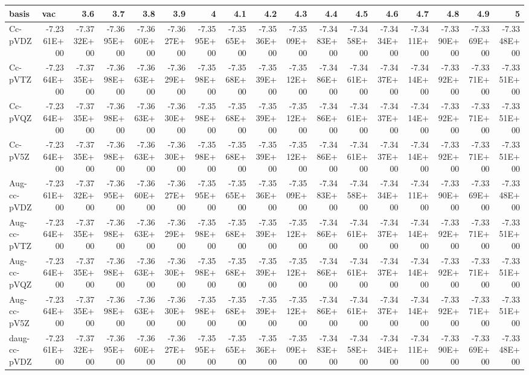 \documentclass[../master_thesis.tex]{subfiles}
\begin{document}
\begin{table}
{{\begin{tabular}{|l|r|r|r|r|r|r|r|r|r|r|r|r|r|r|r|r|}
\hline
basis & \multicolumn{1}{l|}{vac} & 3.6 & 3.7 & 3.8 & 3.9 & 4 & 4.1 & 4.2 & 4.3 & 4.4 & 4.5 & 4.6 & 4.7 & 4.8 & 4.9 & 5 \\ \hline
Cc-pVDZ & -7.2361E+00 & -7.3732E+00 & -7.3695E+00 & -7.3660E+00 & -7.3627E+00 & -7.3595E+00 & -7.3565E+00 & -7.3536E+00 & -7.3509E+00 & -7.3483E+00 & -7.3458E+00 & -7.3434E+00 & -7.3411E+00 & -7.3390E+00 & -7.3369E+00 & -7.3348E+00 \\ \hline
Cc-pVTZ & -7.2364E+00 & -7.3735E+00 & -7.3698E+00 & -7.3663E+00 & -7.3629E+00 & -7.3598E+00 & -7.3568E+00 & -7.3539E+00 & -7.3512E+00 & -7.3486E+00 & -7.3461E+00 & -7.3437E+00 & -7.3414E+00 & -7.3392E+00 & -7.3371E+00 & -7.3351E+00 \\ \hline
Cc-pVQZ & -7.2364E+00 & -7.3735E+00 & -7.3698E+00 & -7.3663E+00 & -7.3630E+00 & -7.3598E+00 & -7.3568E+00 & -7.3539E+00 & -7.3512E+00 & -7.3486E+00 & -7.3461E+00 & -7.3437E+00 & -7.3414E+00 & -7.3392E+00 & -7.3371E+00 & -7.3351E+00 \\ \hline
Cc-pV5Z & -7.2364E+00 & -7.3735E+00 & -7.3698E+00 & -7.3663E+00 & -7.3630E+00 & -7.3598E+00 & -7.3568E+00 & -7.3539E+00 & -7.3512E+00 & -7.3486E+00 & -7.3461E+00 & -7.3437E+00 & -7.3414E+00 & -7.3392E+00 & -7.3371E+00 & -7.3351E+00 \\ \hline
Aug-cc-pVDZ & -7.2361E+00 & -7.3732E+00 & -7.3695E+00 & -7.3660E+00 & -7.3627E+00 & -7.3595E+00 & -7.3565E+00 & -7.3536E+00 & -7.3509E+00 & -7.3483E+00 & -7.3458E+00 & -7.3434E+00 & -7.3411E+00 & -7.3390E+00 & -7.3369E+00 & -7.3348E+00 \\ \hline
Aug-cc-pVTZ & -7.2364E+00 & -7.3735E+00 & -7.3698E+00 & -7.3663E+00 & -7.3629E+00 & -7.3598E+00 & -7.3568E+00 & -7.3539E+00 & -7.3512E+00 & -7.3486E+00 & -7.3461E+00 & -7.3437E+00 & -7.3414E+00 & -7.3392E+00 & -7.3371E+00 & -7.3351E+00 \\ \hline
Aug-cc-pVQZ & -7.2364E+00 & -7.3735E+00 & -7.3698E+00 & -7.3663E+00 & -7.3630E+00 & -7.3598E+00 & -7.3568E+00 & -7.3539E+00 & -7.3512E+00 & -7.3486E+00 & -7.3461E+00 & -7.3437E+00 & -7.3414E+00 & -7.3392E+00 & -7.3371E+00 & -7.3351E+00 \\ \hline
Aug-cc-pV5Z & -7.2364E+00 & -7.3735E+00 & -7.3698E+00 & -7.3663E+00 & -7.3630E+00 & -7.3598E+00 & -7.3568E+00 & -7.3539E+00 & -7.3512E+00 & -7.3486E+00 & -7.3461E+00 & -7.3437E+00 & -7.3414E+00 & -7.3392E+00 & -7.3371E+00 & -7.3351E+00 \\ \hline
daug-cc-pVDZ & -7.2361E+00 & -7.3732E+00 & -7.3695E+00 & -7.3660E+00 & -7.3627E+00 & -7.3595E+00 & -7.3565E+00 & -7.3536E+00 & -7.3509E+00 & -7.3483E+00 & -7.3458E+00 & -7.3434E+00 & -7.3411E+00 & -7.3390E+00 & -7.3369E+00 & -7.3348E+00 \\ \hline

\end{tabular}}}
\end{table}
\end{document}
